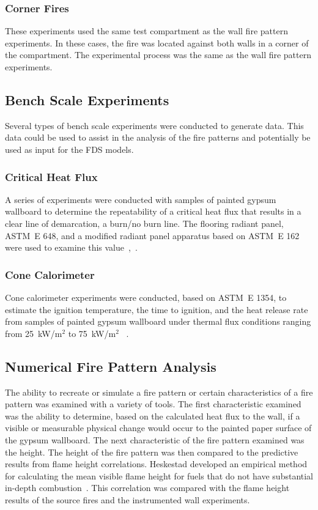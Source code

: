 \documentclass[twoside]{uocthesis}
\begin{document}
{\subsubsection{Corner Fires}

These experiments used the same test compartment as the wall fire pattern experiments.  In these cases, the fire was located against both walls in a corner of the compartment.  The experimental process was the same as the wall fire pattern experiments.

\subsection{Bench Scale Experiments}

Several types of bench scale experiments were conducted to generate data. This data could be used to assist in the analysis of the fire patterns and potentially be used as input for the FDS models.

\subsubsection{Critical Heat Flux}

A series of experiments were conducted with samples of painted gypsum wallboard to determine the repeatability of a critical heat flux that results in a clear line of demarcation, a burn/no burn line.  The flooring radiant panel, ASTM~E 648, and a modified radiant panel apparatus based on ASTM~E 162 were used to examine this value~\cite{ASTM_E648},~\cite{ASTM_E162}.

\subsubsection{Cone Calorimeter}

Cone calorimeter experiments were conducted, based on ASTM~E 1354, to estimate the ignition temperature, the time to ignition, and the heat release rate from samples of painted gypsum wallboard under thermal flux conditions ranging from 25~kW/m$^2$ to 75~kW/m$^2$ ~\cite{ASTM_E1354}.

\subsection{Numerical Fire Pattern Analysis}

The ability to recreate or simulate a fire pattern or certain characteristics of a fire pattern was examined with a variety of tools.  The first characteristic examined was the ability to determine, based on the calculated heat flux to the wall, if a visible or measurable physical change would occur to the painted paper surface of the gypsum wallboard.  The next characteristic of the fire pattern examined was the height.  The height of the fire pattern was then compared to the predictive results from flame height correlations. Heskestad developed an empirical method for calculating the mean visible flame height for fuels that do not have substantial in-depth combustion~\cite{Beyler:1986,Heskestad:SFPE}. This correlation was compared with the flame height results of the source fires and the instrumented wall experiments.

}
\end{document}
